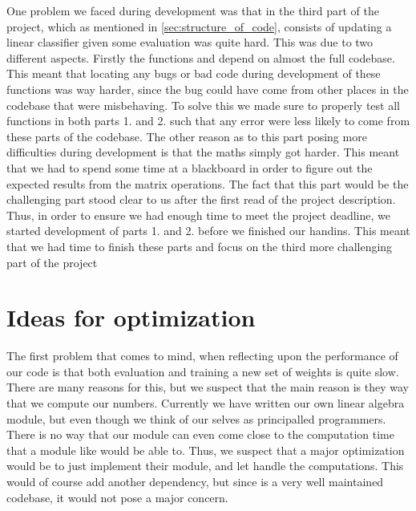 \documentclass[a4paper,oneside,article,english]{memoir}
\begin{document}
One problem we faced during development was that in the third part of the
project, which as mentioned in \cref{sec:structure_of_code}, consists of
updating a linear classifier given some evaluation was quite hard. This was due
to two different aspects. Firstly the functions  and
 depend on almost the full codebase. This meant that
locating any bugs or bad code during development of these functions was way
harder, since the bug could have come from other places in the codebase that
were misbehaving. To solve this we made sure to properly test all functions in
both parts 1. and 2. such that any error were less likely to come from these
parts of the codebase. The other reason as to this part posing more
difficulties during development is that the maths simply got harder. This meant
that we had to spend some time at a blackboard in order to figure out the
expected results from the matrix operations. The fact that this part would be
the challenging part stood clear to us after the first read of the project
description. Thus, in order to ensure we had enough time to meet the project
deadline, we started development of parts 1. and 2. before we finished our
handins. This meant that we had time to finish these parts and focus on the
third more challenging part of the project 

\section{Ideas for optimization}  
\label{sec:ideas_for_optimization}

The first problem that comes to mind, when reflecting upon the performance of
our code is that both evaluation and training a new set of weights is quite
slow. There are many reasons for this, but we suspect that the main reason is
they way that we compute our numbers. Currently we have written our own linear
algebra module, but even though we think of our selves as principalled
programmers. There is no way that our module can even come close to the
computation time that a module like  would be able to. Thus,
we suspect that a major optimization would be to just implement their module,
and let  handle the computations. This would of course
add another dependency, but since  is a very well maintained
codebase, it would not pose a major concern.
\end{document}
